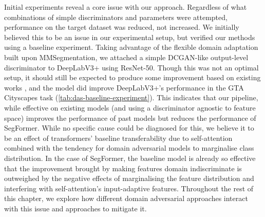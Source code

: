 \documentclass[a4paper,12pt]{report}
\begin{document}
Initial experiments reveal a core issue with our approach. Regardless of what combinations of simple discriminators and parameters were attempted, performance on the target dataset was reduced, not increased. We initially believed this to be an issue in our experimental setup, but verified our methods using a baseline experiment. Taking advantage of the flexible domain adaptation built upon MMSegmentation, we attached a simple DCGAN-like output-level discriminator to DeepLabV3+ using ResNet-50. Though this was not an optimal setup, it should still be expected to produce some improvement based on existing works \cite{tsai_learning_2020}, and the model did improve DeepLabV3+'s performance in the GTA \textrightarrow Cityscapes task (\autoref{tab:das-baseline-experiment}). This indicates that our pipeline, while effective on existing models (and using a discriminator agnostic to feature space) improves the performance of past models but reduces the performance of SegFormer. While no specific cause could be diagnosed for this, we believe it to be an effect of transformers' baseline transferability due to self-attention \cite{dosovitskiy_image_2021} combined with the tendency for domain adversarial models to marginalise class distribution. In the case of SegFormer, the baseline model is already so effective that the improvement brought by making features domain indiscriminate is outweighed by the negative effects of marginalising the feature distribution and interfering with self-attention's input-adaptive features. Throughout the rest of this chapter, we explore how different domain adversarial approaches interact with this issue and approaches to mitigate it.

\begin{table}[]
    \caption{Baseline experiment results comparing SegFormer and DeeplabV3+. Both experiments used a simplified DCGAN-like \cite{radford_unsupervised_2016} discriminator consisting of 3 convolutional layers with 64, 128, and 2 channels respectively.}
    \label{tab:das-baseline-experiment}
\end{table}
\end{document}
